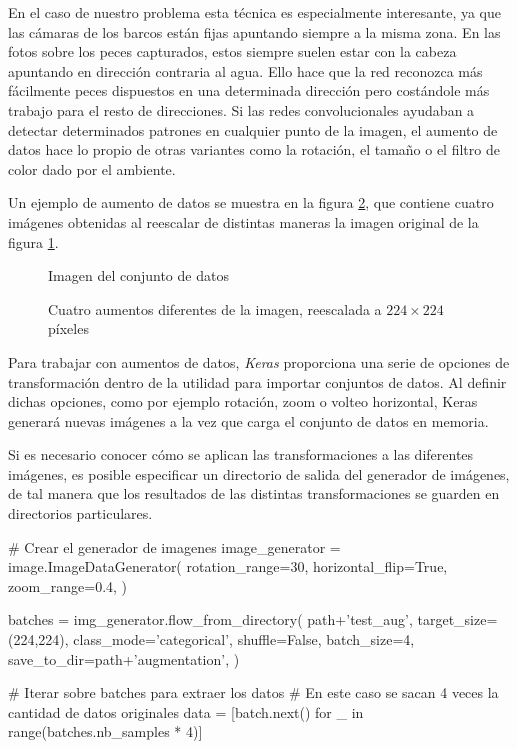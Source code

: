 En el caso de nuestro problema esta técnica es especialmente interesante, ya que las cámaras de los barcos están fijas apuntando siempre a la misma zona. En las fotos sobre los peces capturados, estos siempre suelen estar con la cabeza apuntando en dirección contraria al agua. Ello hace que la red reconozca más fácilmente peces dispuestos en una determinada dirección pero costándole más trabajo para el resto de direcciones. Si las redes convolucionales ayudaban a detectar determinados patrones en cualquier punto de la imagen, el aumento de datos hace lo propio de otras variantes como la rotación, el tamaño o el filtro de color dado por el ambiente.

Un ejemplo de aumento de datos se muestra en la figura \ref{augmentations}, que contiene cuatro imágenes obtenidas al reescalar de distintas maneras la imagen original de la figura \ref{aug-original}.

\begin{figure}
    \caption{Imagen del conjunto de datos}
\label{aug-original}
\end{figure}

\begin{figure}
    \caption{Cuatro aumentos diferentes de la imagen, reescalada a $224\times224$ píxeles}
\label{augmentations}
  \makebox[\textwidth]{\texttt{[image: au1]}}
  \makebox[\textwidth]{\texttt{[image: au3]}}
  \makebox[\textwidth]{\texttt{[image: au2]}}
  \makebox[\textwidth]{\texttt{[image: au4]}}
\end{figure}

Para trabajar con aumentos de datos, \textit{Keras} proporciona una serie de opciones de transformación dentro de la utilidad para importar conjuntos de datos. Al definir dichas opciones, como por ejemplo rotación, zoom o volteo horizontal, Keras generará nuevas imágenes a la vez que carga el conjunto de datos en memoria.

Si es necesario conocer cómo se aplican las transformaciones a las diferentes imágenes, es posible especificar un directorio de salida del generador de imágenes, de tal manera que los resultados de las distintas transformaciones se guarden en directorios particulares.

\begin{python}
# Crear el generador de imagenes
image_generator = image.ImageDataGenerator(
    rotation_range=30,
    horizontal_flip=True,
    zoom_range=0.4,
)

batches = img_generator.flow_from_directory(
    path+'test_aug',
    target_size=(224,224),
    class_mode='categorical',
    shuffle=False,
    batch_size=4,
    save_to_dir=path+'augmentation',
)

# Iterar sobre batches para extraer los datos
# En este caso se sacan 4 veces la cantidad de datos originales
data = [batch.next() for _ in range(batches.nb_samples * 4)]
\end{python}

